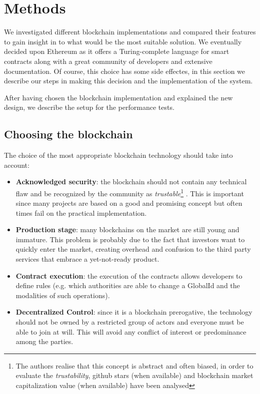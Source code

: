 \section{Methods}
\label{S:4}

We investigated different blockchain implementations and compared their features to gain insight in to what would be the most suitable solution. We eventually decided upon Ethereum as it offers a Turing-complete language for smart contracts along with a great community of developers and extensive documentation. Of course, this choice has some side effectes, in this section we describe our steps in making this decision and the implementation of the system.  

After having chosen the blockchain implementation and explained the new design, we describe the setup for the performance tests.

\subsection{Choosing the blockchain}

The choice of the most appropriate blockchain technology should take into account:
\begin{itemize}
  \item \textbf{Acknowledged security}: the blockchain should not contain any technical flaw and be recognized by the community as \textit{trustable}\footnote{The authors realise that this concept is abstract and often biased, in order to evaluate the \textit{trustability}, github stars (when available) and blockchain market capitalization value (when available) have been analysed} . This is important since many projects are based on a good and promising concept but often times fail on the practical implementation.
  \item \textbf{Production stage}: many blockchains on the market are still young and immature. This problem is probably due to the fact that investors want to quickly enter the market, creating overhead and confusion to the third party services that embrace a yet-not-ready product.
  \item \textbf{Contract execution}: the execution of the contracts allows developers to define rules (e.g. which authorities are able to change a GlobalId and the modalities of such operations).
  \item \textbf{Decentralized Control}: since it is a blockchain prerogative, the technology should not be owned by a restricted group of actors and everyone must be able to join at will. This will avoid any conflict of interest or predominance among the parties.
\end{itemize}

